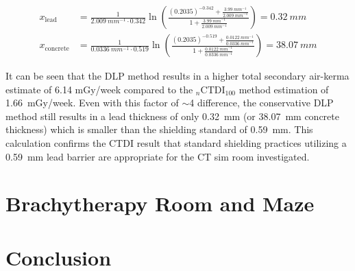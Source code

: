 \documentclass[%
aps,
mph,%
amsmath,amssymb,
preprint,%
tightenlines,
longbibliography,
superscriptaddress,
floatfix,
nofootinbib,
]{revtex4-2}
\begin{document}
        
        \begin{align*}
            x\mathrm{_{lead}} &= \frac{1}{\qty{2.009}{mm^{-1}}\cdot0.342}\ln\left(\frac{( 0.2035)^{-0.342}+\frac{\qty{3.99}{mm^{-1}}}{\qty{2.009}{mm^{-1}}}}{1+ \frac{\qty{3.99}{mm^{-1}}}{\qty{2.009}{mm^{-1}}}} \right) = \qty{0.32}{mm}\\
            x\mathrm{_{concrete}} &= \frac{1}{\qty{0.0336}{mm^{-1}}\cdot0.519}\ln\left(\frac{( 0.2035)^{-0.519}+\frac{\qty{0.0122}{mm^{-1}}}{\qty{0.0336}{mm^{-1}}}}{1+ \frac{\qty{0.0122}{mm^{-1}}}{\qty{0.0336}{mm^{-1}}}} \right) = \qty{38.07}{mm}
        \end{align*}
        
        It can be seen that the DLP method results in a higher total secondary air-kerma estimate of 6.14 mGy/week compared to the $_n\mathrm{CTDI}_{100}$ method estimation of \qty{1.66}{mGy/week}. Even with this factor of $\sim$4 difference, the conservative DLP method still results in a lead thickness of only \qty{0.32}{mm} (or \qty{38.07}{mm} concrete thickness) which is smaller than the shielding standard of \qty{0.59}{mm}. This calculation confirms the CTDI result that standard shielding practices utilizing a \qty{0.59}{mm} lead barrier are appropriate for the CT sim room investigated. 

\section{Brachytherapy Room and Maze}

\section{Conclusion}


\end{document}
